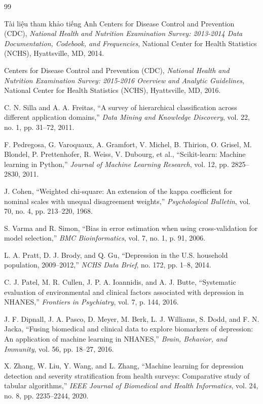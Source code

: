 \documentclass{uetgraduation}
\begin{document}
\begin{thebibliography}{99}
\begin{bibsection}{Tài liệu tham khảo tiếng Anh}
    Centers for Disease Control and Prevention (CDC),
    \textit{National Health and Nutrition Examination Survey: 2013-2014 Data Documentation, Codebook, and Frequencies},
    National Center for Health Statistics (NCHS), Hyattsville, MD, 2014.

    Centers for Disease Control and Prevention (CDC),
    \textit{National Health and Nutrition Examination Survey: 2015-2016 Overview and Analytic Guidelines},
    National Center for Health Statistics (NCHS), Hyattsville, MD, 2016.

    C. N. Silla and A. A. Freitas,
    ``A survey of hierarchical classification across different application domains,''
    \textit{Data Mining and Knowledge Discovery}, vol. 22, no. 1, pp. 31--72, 2011.

    F. Pedregosa, G. Varoquaux, A. Gramfort, V. Michel, B. Thirion, O. Grisel, M. Blondel, P. Prettenhofer, R. Weiss, V. Dubourg, et al.,
    ``Scikit-learn: Machine learning in Python,''
    \textit{Journal of Machine Learning Research}, vol. 12, pp. 2825--2830, 2011.

    J. Cohen,
    ``Weighted chi-square: An extension of the kappa coefficient for nominal scales with unequal disagreement weights,''
    \textit{Psychological Bulletin}, vol. 70, no. 4, pp. 213--220, 1968.

    S. Varma and R. Simon,
    ``Bias in error estimation when using cross-validation for model selection,''
    \textit{BMC Bioinformatics}, vol. 7, no. 1, p. 91, 2006.

    L. A. Pratt, D. J. Brody, and Q. Gu,
    ``Depression in the {U.S.} household population, 2009--2012,''
    \textit{NCHS Data Brief}, no. 172, pp. 1--8, 2014.

    C. J. Patel, M. R. Cullen, J. P. A. Ioannidis, and A. J. Butte,
    ``Systematic evaluation of environmental and clinical factors associated with depression in {NHANES},''
    \textit{Frontiers in Psychiatry}, vol. 7, p. 144, 2016.

    J. F. Dipnall, J. A. Pasco, D. Meyer, M. Berk, L. J. Williams, S. Dodd, and F. N. Jacka,
    ``Fusing biomedical and clinical data to explore biomarkers of depression: An application of machine learning in {NHANES},''
    \textit{Brain, Behavior, and Immunity}, vol. 56, pp. 18--27, 2016.

    X. Zhang, W. Liu, Y. Wang, and L. Zhang,
    ``Machine learning for depression detection and severity stratification from health surveys: Comparative study of tabular algorithms,''
    \textit{IEEE Journal of Biomedical and Health Informatics}, vol. 24, no. 8, pp. 2235--2244, 2020.
\end{bibsection}

\end{thebibliography}
\end{document}
